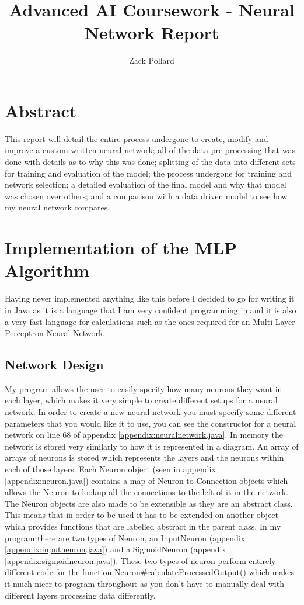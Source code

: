 \documentclass[10pt, a4paper]{article}
\begin{document}

\setcounter{page}{1}

\title{Advanced AI Coursework - Neural Network Report}
\author{Zack Pollard}
\maketitle

\tableofcontents

\section*{Abstract}
This report will detail the entire process undergone to create, modify and improve a custom written neural network; all of the data pre-processing that was done with details as to why this was done; splitting of the data into different sets for training and evaluation of the model; the process undergone for training and network selection; a detailed evaluation of the final model and why that model was chosen over others; and a comparison with a data driven model to see how my neural network compares.

\section{Implementation of the MLP Algorithm}
Having never implemented anything like this before I decided to go for writing it in Java as it is a language that I am very confident programming in and it is also a very fast language for calculations such as the ones required for an Multi-Layer Perceptron Neural Network.

\subsection{Network Design}
My program allows the user to easily specify how many neurons they want in each layer, which makes it very simple to create different setups for a neural network. In order to create a new neural network you must specify some different parameters that you would like it to use, you can see the constructor for a neural network on line 68 of appendix \ref{appendix:neuralnetwork.java}. In memory the network is stored very similarly to how it is represented in a diagram. An array of arrays of neurons is stored which represents the layers and the neurons within each of those layers. Each Neuron object (seen in appendix \ref{appendix:neuron.java}) contains a map of Neuron to Connection objects which allows the Neuron to lookup all the connections to the left of it in the network. The Neuron objects are also made to be extensible as they are an abstract class. This means that in order to be used it has to be extended on another object which provides functions that are labelled abstract in the parent class. In my program there are two types of Neuron, an InputNeuron (appendix \ref{appendix:inputneuron.java}) and a SigmoidNeuron (appendix \ref{appendix:sigmoidneuron.java}). These two types of neuron perform entirely different code for the function Neuron\#calculateProcessedOutput() which makes it much nicer to program throughout as you don't have to manually deal with different layers processing data differently.
\end{document}
